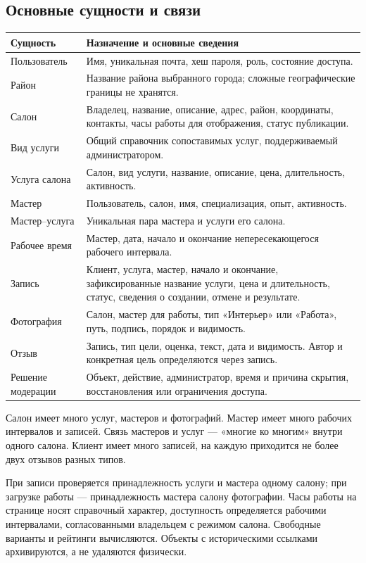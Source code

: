 \subsection{Основные сущности и связи}
\begin{longtable}{L{3.4cm}L{11.4cm}}
\toprule Сущность & Назначение и основные сведения \\ \midrule
\endhead
Пользователь & Имя, уникальная почта, хеш пароля, роль, состояние доступа. \\
Район & Название района выбранного города; сложные географические границы не хранятся. \\
Салон & Владелец, название, описание, адрес, район, координаты, контакты, часы работы для отображения, статус публикации. \\
Вид услуги & Общий справочник сопоставимых услуг, поддерживаемый администратором. \\
Услуга салона & Салон, вид услуги, название, описание, цена, длительность, активность. \\
Мастер & Пользователь, салон, имя, специализация, опыт, активность. \\
Мастер--услуга & Уникальная пара мастера и услуги его салона. \\
Рабочее время & Мастер, дата, начало и окончание непересекающегося рабочего интервала. \\
Запись & Клиент, услуга, мастер, начало и окончание, зафиксированные название услуги, цена и длительность, статус, сведения о создании, отмене и результате. \\
Фотография & Салон, мастер для работы, тип «Интерьер» или «Работа», путь, подпись, порядок и видимость. \\
Отзыв & Запись, тип цели, оценка, текст, дата и видимость. Автор и конкретная цель определяются через запись. \\
Решение модерации & Объект, действие, администратор, время и причина скрытия, восстановления или ограничения доступа. \\
\bottomrule
\end{longtable}
Салон имеет много услуг, мастеров и фотографий. Мастер имеет много рабочих интервалов и записей. Связь мастеров и услуг --- «многие ко многим» внутри одного салона. Клиент имеет много записей, на каждую приходится не более двух отзывов разных типов.

При записи проверяется принадлежность услуги и мастера одному салону; при загрузке работы --- принадлежность мастера салону фотографии. Часы работы на странице носят справочный характер, доступность определяется рабочими интервалами, согласованными владельцем с режимом салона. Свободные варианты и рейтинги вычисляются. Объекты с историческими ссылками архивируются, а не удаляются физически.

